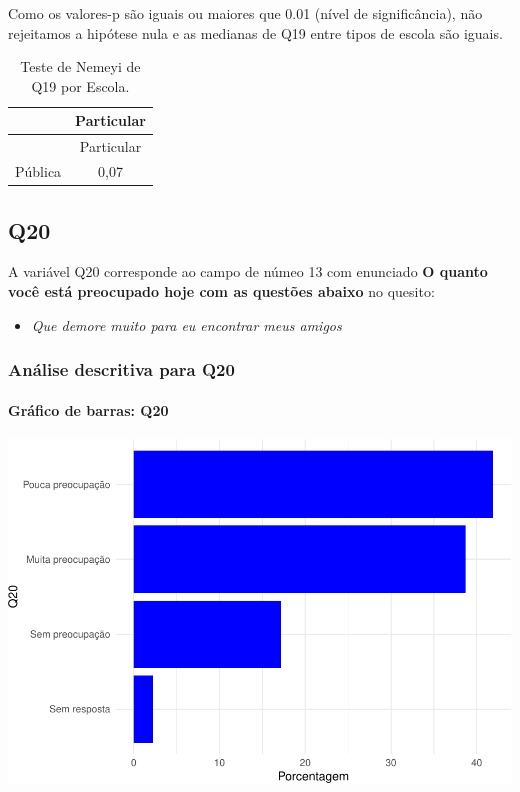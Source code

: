 \documentclass[]{article}
\providecommand{\tightlist}{%
  \setlength{\itemsep}{0pt}\setlength{\parskip}{0pt}}
\let\oldparagraph\paragraph
\renewcommand{\paragraph}[1]{\oldparagraph{#1}\mbox{}}
\begin{document}
Como os valores-p são iguais ou maiores que 0.01 (nível de significância), não rejeitamos a hipótese nula e as medianas de Q19 entre tipos de escola são iguais.

\begin{longtable}[]{@{}lc@{}}
\caption{\label{tab:unnamed-chunk-356}Teste de Nemeyi de Q19 por Escola.}\tabularnewline
\toprule
& Particular\tabularnewline
\midrule
\endfirsthead
\toprule
& Particular\tabularnewline
\midrule
\endhead
Pública & 0,07\tabularnewline
\bottomrule
\end{longtable}

\cleardoublepage

\hypertarget{q20}{%
\subsection{Q20}\label{q20}}

A variável Q20 corresponde ao campo de númeo 13 com enunciado \textbf{O quanto você está preocupado hoje com as questões abaixo} no quesito:

\begin{itemize}
\tightlist
\item
  \emph{Que demore muito para eu encontrar meus amigos}
\end{itemize}

\hypertarget{anuxe1lise-descritiva-para-q20}{%
\subsubsection{Análise descritiva para Q20}\label{anuxe1lise-descritiva-para-q20}}

\hypertarget{gruxe1fico-de-barras-q20}{%
\paragraph{Gráfico de barras: Q20}\label{gruxe1fico-de-barras-q20}}

\begin{center}\includegraphics[width=0.75\linewidth]{relatorio_covid19_files/figure-latex/unnamed-chunk-363-1} \end{center}
\end{document}
